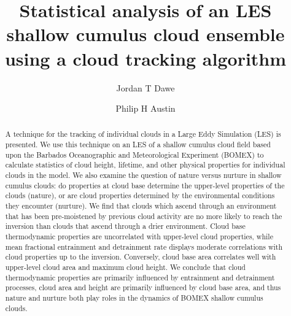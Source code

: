 \documentclass[acp]{copernicus}
\begin{document}
\title{Statistical analysis of an LES shallow cumulus cloud ensemble using a 
cloud tracking algorithm}


\author[1]{Jordan T Dawe}
\author[1]{Philip H Austin}










\received{}
\pubdiscuss{} %
\revised{}
\accepted{}
\published{}




\maketitle



\begin{abstract}
A technique for the tracking of individual clouds in a Large Eddy Simulation 
(LES) is presented.  We use this technique on an LES of a shallow cumulus cloud 
field based upon the Barbados Oceanographic and Meteorological Experiment 
(BOMEX) to calculate statistics of cloud height, lifetime, and other physical 
properties for individual clouds in the model.  We also examine the question of 
nature versus nurture in shallow cumulus clouds: do properties at cloud base 
determine the upper-level properties of the clouds (nature), or are cloud 
properties determined by the environmental conditions they encounter (nurture). 
We find that clouds which ascend through an environment that has been 
pre-moistened by previous cloud activity are no more likely to reach the 
inversion than clouds that ascend through a drier environment.  Cloud base 
thermodynamic properties are uncorrelated with upper-level cloud properties, 
while mean fractional entrainment and detrainment rate displays moderate 
correlations with cloud properties up to the inversion.  Conversely, cloud base 
area correlates well with upper-level cloud area and maximum cloud height.  We 
conclude that cloud thermodynamic properties are primarily influenced by 
entrainment and detrainment processes, cloud area and height are primarily 
influenced by cloud base area, and thus nature and nurture both play roles in 
the dynamics of BOMEX shallow cumulus clouds.
\end{abstract}
\end{document}
